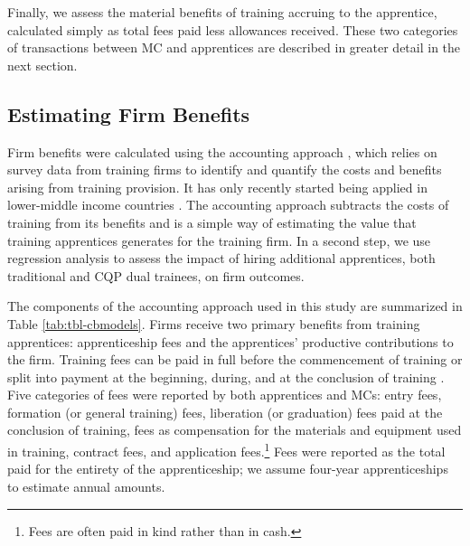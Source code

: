 \documentclass[
  a4paper, twoside, 12pt]{book}
\begin{document}
Finally, we assess the material benefits of training accruing to the apprentice, calculated simply as total fees paid less allowances received. These two categories of transactions between MC and apprentices are described in greater detail in the next section.

\hypertarget{firmmethod}{%
\subsection{Estimating Firm Benefits}\label{firmmethod}}

\begin{singlespacing}

\end{singlespacing}

Firm benefits were calculated using the accounting approach \autocite{gambin2013,muhlemann2014}, which relies on survey data from training firms to identify and quantify the costs and benefits arising from training provision. It has only recently started being applied in lower-middle income countries \autocite{renold2018,bolli2020,bolli2021}. The accounting approach subtracts the costs of training from its benefits and is a simple way of estimating the value that training apprentices generates for the training firm. In a second step, we use regression analysis to assess the impact of hiring additional apprentices, both traditional and CQP dual trainees, on firm outcomes.

The components of the accounting approach used in this study are summarized in Table \ref{tab:tbl-cbmodels}. Firms receive two primary benefits from training apprentices: apprenticeship fees and the apprentices' productive contributions to the firm. Training fees can be paid in full before the commencement of training or split into payment at the beginning, during, and at the conclusion of training \autocite{velenchik1995}. Five categories of fees were reported by both apprentices and MCs: entry fees, formation (or general training) fees, liberation (or graduation) fees paid at the conclusion of training, fees as compensation for the materials and equipment used in training, contract fees, and application fees.\footnote{Fees are often paid in kind rather than in cash.} Fees were reported as the total paid for the entirety of the apprenticeship; we assume four-year apprenticeships to estimate annual amounts.
\end{document}
